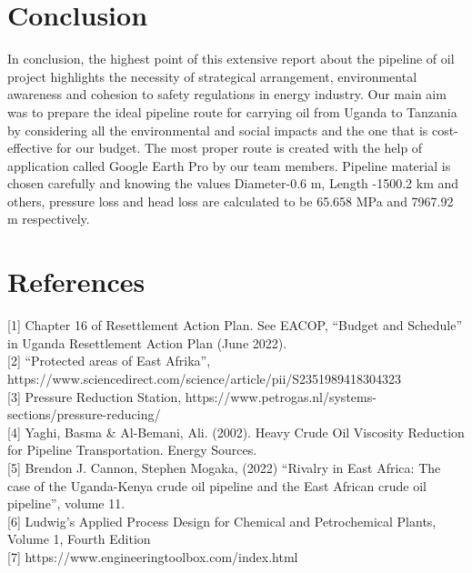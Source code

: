 \documentclass[12pt]{article}
\begin{document}
\section{Conclusion}
{\fontsize{12pt}{12pt}\selectfont
\hspace*{1em} In conclusion, the highest point of this extensive report about the pipeline of oil project highlights the necessity of strategical arrangement, environmental awareness and cohesion to safety regulations in energy industry. Our main aim was to prepare the ideal pipeline route for carrying oil from Uganda to Tanzania by considering all the environmental and social impacts and the one that is cost-effective for our budget. The most proper route is created with the help of application called Google Earth Pro by our team members. Pipeline material is chosen carefully and knowing the values Diameter-0.6 m, Length -1500.2 km and others, pressure loss and head loss are calculated to be 65.658 MPa and 7967.92 m respectively.

}

\newpage
\section{References}

{\fontsize{12pt}{12pt}\selectfont

\hspace{1.2em} [1]	Chapter 16 of Resettlement Action Plan. See EACOP, “Budget and Schedule” in Uganda Resettlement Action Plan (June 2022). \\

[2] “Protected areas of East Afrika”, https://www.sciencedirect.com/science/article/pii/S2351989418304323 \\

[3]	Pressure Reduction Station, https://www.petrogas.nl/systems-sections/pressure-reducing/ \\




[4]	Yaghi, Basma \& Al-Bemani, Ali. (2002). Heavy Crude Oil Viscosity Reduction for Pipeline Transportation. Energy Sources. \\

[5]	Brendon J. Cannon, Stephen Mogaka, (2022) “Rivalry in East Africa: The case of the Uganda-Kenya crude oil pipeline and the East African crude oil pipeline”, volume 11. \\


[6]	Ludwig's Applied Process Design for Chemical and Petrochemical Plants, Volume 1, Fourth Edition \\

[7]	https://www.engineeringtoolbox.com/index.html \\

}
\end{document}

